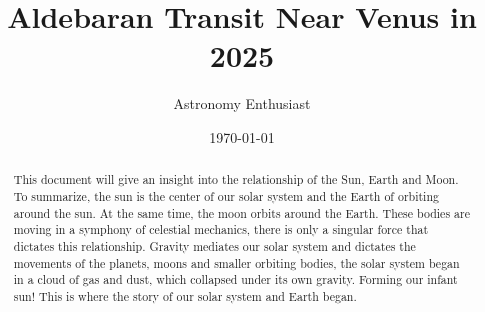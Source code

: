 \documentclass[12pt,oneside,a4paper,english]{article}
\title{\textbf{Aldebaran Transit Near Venus in 2025}}
\author{Astronomy Enthusiast}
\date{\today}
\begin{document}
\maketitle

\begin{abstract}
    This document will give an insight into the relationship of the Sun, Earth and Moon. To summarize, the sun is the center of our solar system and the Earth of orbiting around the sun. At the same time, the moon orbits around the Earth. These bodies are moving in a symphony of celestial mechanics, there is only a singular force that dictates this relationship. Gravity mediates our solar system and dictates the movements of the planets, moons and smaller orbiting bodies, the solar system began in a cloud of gas and dust, which collapsed under its own gravity. Forming our infant sun! This is where the story of our solar system and Earth began.
\end{abstract}
\end{document}
